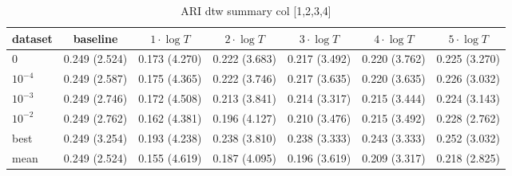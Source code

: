     
    \begin{table}[ht]
    \caption{ARI dtw summary col [1,2,3,4]} 
    \begin{adjustbox}{width=\textwidth}
    \begin{tabular}{lcccccc}
    \hline
    dataset & baseline & \textbf{$1\cdot \log{T}$} & \textbf{$2\cdot \log{T}$} & \textbf{$3\cdot \log{T}$} & \textbf{$4\cdot \log{T}$} & \textbf{$5\cdot \log{T}$} \\ \hline
    $0$ & 0.249 (2.524) & 0.173 (4.270) & 0.222 (3.683) & 0.217 (3.492) & 0.220 (3.762) & 0.225 (3.270) \\ 
    $10^{-4}$ & 0.249 (2.587) & 0.175 (4.365) & 0.222 (3.746) & 0.217 (3.635) & 0.220 (3.635) & 0.226 (3.032) \\ 
    $10^{-3}$ & 0.249 (2.746) & 0.172 (4.508) & 0.213 (3.841) & 0.214 (3.317) & 0.215 (3.444) & 0.224 (3.143) \\ 
    $10^{-2}$ & 0.249 (2.762) & 0.162 (4.381) & 0.196 (4.127) & 0.210 (3.476) & 0.215 (3.492) & 0.228 (2.762) \\ 
    best & 0.249 (3.254) & 0.193 (4.238) & 0.238 (3.810) & 0.238 (3.333) & 0.243 (3.333) & 0.252 (3.032) \\ 
    mean & 0.249 (2.524) & 0.155 (4.619) & 0.187 (4.095) & 0.196 (3.619) & 0.209 (3.317) & 0.218 (2.825) \\ 
    \hline
    \end{tabular}
    \end{adjustbox}
    \end{table}
    
    
    
